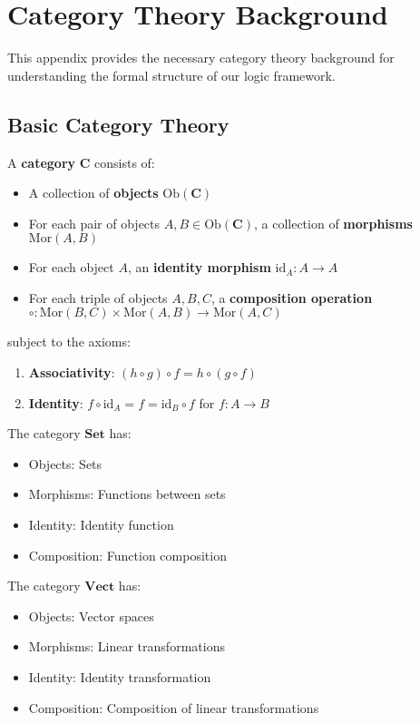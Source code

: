 \section{Category Theory Background}
\label{app:category-theory}

This appendix provides the necessary category theory background for understanding the formal structure of our logic framework.

\subsection{Basic Category Theory}

\begin{definition}[Category]
A \textbf{category} $\mathbf{C}$ consists of:
\begin{itemize}
\item A collection of \textbf{objects} $\text{Ob}(\mathbf{C})$
\item For each pair of objects $A, B \in \text{Ob}(\mathbf{C})$, a collection of \textbf{morphisms} $\text{Mor}(A, B)$
\item For each object $A$, an \textbf{identity morphism} $\text{id}_A: A \to A$
\item For each triple of objects $A, B, C$, a \textbf{composition operation} $\circ: \text{Mor}(B, C) \times \text{Mor}(A, B) \to \text{Mor}(A, C)$
\end{itemize}
subject to the axioms:
\begin{enumerate}
\item \textbf{Associativity}: $(h \circ g) \circ f = h \circ (g \circ f)$
\item \textbf{Identity}: $f \circ \text{id}_A = f = \text{id}_B \circ f$ for $f: A \to B$
\end{enumerate}
\end{definition}

\begin{example}
The category $\mathbf{Set}$ has:
\begin{itemize}
\item Objects: Sets
\item Morphisms: Functions between sets
\item Identity: Identity function
\item Composition: Function composition
\end{itemize}
\end{example}

\begin{example}
The category $\mathbf{Vect}$ has:
\begin{itemize}
\item Objects: Vector spaces
\item Morphisms: Linear transformations
\item Identity: Identity transformation
\item Composition: Composition of linear transformations
\end{itemize}
\end{example}

